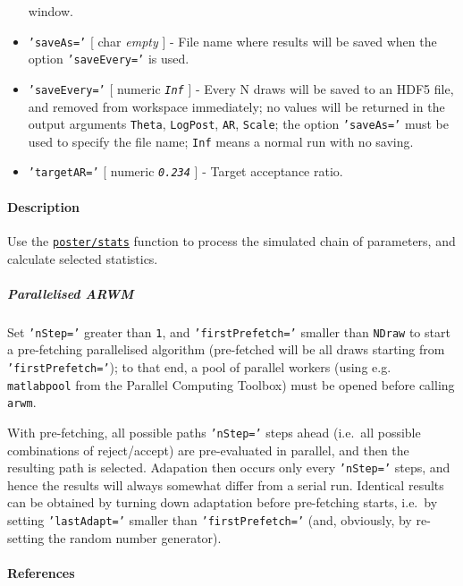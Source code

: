 \begin{itemize}
  window.
\item
  \texttt{'saveAs='} {[} char \textbar{} \emph{empty} {]} - File name
  where results will be saved when the option \texttt{'saveEvery='} is
  used.
\item
  \texttt{'saveEvery='} {[} numeric \textbar{} \emph{\texttt{Inf}} {]} -
  Every N draws will be saved to an HDF5 file, and removed from
  workspace immediately; no values will be returned in the output
  arguments \texttt{Theta}, \texttt{LogPost}, \texttt{AR},
  \texttt{Scale}; the option \texttt{'saveAs='} must be used to specify
  the file name; \texttt{Inf} means a normal run with no saving.
\item
  \texttt{'targetAR='} {[} numeric \textbar{} \emph{\texttt{0.234}} {]}
  - Target acceptance ratio.
\end{itemize}

\paragraph{Description}\label{description}

Use the \href{poster/stats}{\texttt{poster/stats}} function to process
the simulated chain of parameters, and calculate selected statistics.

\subparagraph{Parallelised ARWM}\label{parallelised-arwm}

Set \texttt{'nStep='} greater than \texttt{1}, and
\texttt{'firstPrefetch='} smaller than \texttt{NDraw} to start a
pre-fetching parallelised algorithm (pre-fetched will be all draws
starting from \texttt{'firstPrefetch='}); to that end, a pool of
parallel workers (using e.g. \texttt{matlabpool} from the Parallel
Computing Toolbox) must be opened before calling \texttt{arwm}.

With pre-fetching, all possible paths \texttt{'nStep='} steps ahead
(i.e.~all possible combinations of reject/accept) are pre-evaluated in
parallel, and then the resulting path is selected. Adapation then occurs
only every \texttt{'nStep='} steps, and hence the results will always
somewhat differ from a serial run. Identical results can be obtained by
turning down adaptation before pre-fetching starts, i.e.~by setting
\texttt{'lastAdapt='} smaller than \texttt{'firstPrefetch='} (and,
obviously, by re-setting the random number generator).

\paragraph{References}\label{references}

